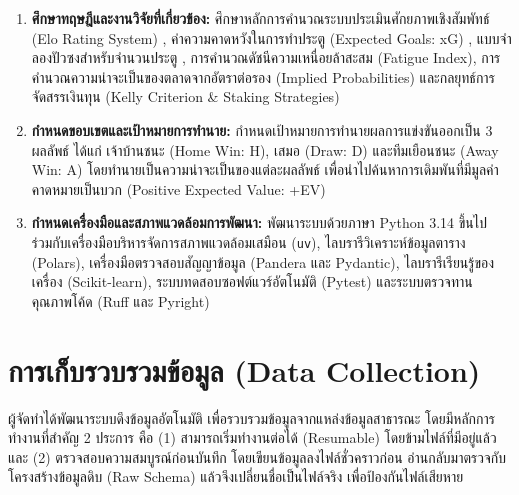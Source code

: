 \begin{enumerate}[label=\arabic*)]
    \item \textbf{ศึกษาทฤษฎีและงานวิจัยที่เกี่ยวข้อง:} ศึกษาหลักการคำนวณระบบประเมินศักยภาพเชิงสัมพัทธ์ (Elo Rating System) \cite{hvattum2010using}, ค่าความคาดหวังในการทำประตู (Expected Goals: xG) \cite{understat2024}, แบบจำลองปัวซงสำหรับจำนวนประตู \cite{dixon1997modelling}, การคำนวณดัชนีความเหนื่อยล้าสะสม (Fatigue Index), การคำนวณความน่าจะเป็นของตลาดจากอัตราต่อรอง (Implied Probabilities) และกลยุทธ์การจัดสรรเงินทุน (Kelly Criterion \& Staking Strategies)
    \item \textbf{กำหนดขอบเขตและเป้าหมายการทำนาย:} กำหนดเป้าหมายการทำนายผลการแข่งขันออกเป็น 3 ผลลัพธ์ ได้แก่ เจ้าบ้านชนะ (Home Win: H), เสมอ (Draw: D) และทีมเยือนชนะ (Away Win: A) โดยทำนายเป็นความน่าจะเป็นของแต่ละผลลัพธ์ เพื่อนำไปค้นหาการเดิมพันที่มีมูลค่าคาดหมายเป็นบวก (Positive Expected Value: +EV)
    \item \textbf{กำหนดเครื่องมือและสภาพแวดล้อมการพัฒนา:} พัฒนาระบบด้วยภาษา Python 3.14 ขึ้นไป ร่วมกับเครื่องมือบริหารจัดการสภาพแวดล้อมเสมือน (\texttt{uv}), ไลบรารีวิเคราะห์ข้อมูลตาราง (Polars), เครื่องมือตรวจสอบสัญญาข้อมูล (Pandera และ Pydantic), ไลบรารีเรียนรู้ของเครื่อง (Scikit-learn), ระบบทดสอบซอฟต์แวร์อัตโนมัติ (Pytest) และระบบตรวจทานคุณภาพโค้ด (Ruff และ Pyright)
\end{enumerate}

\section{การเก็บรวบรวมข้อมูล (Data Collection)}

ผู้จัดทำได้พัฒนาระบบดึงข้อมูลอัตโนมัติ เพื่อรวบรวมข้อมูลจากแหล่งข้อมูลสาธารณะ โดยมีหลักการทำงานที่สำคัญ 2 ประการ คือ (1) สามารถเริ่มทำงานต่อได้ (Resumable) โดยข้ามไฟล์ที่มีอยู่แล้ว และ (2) ตรวจสอบความสมบูรณ์ก่อนบันทึก โดยเขียนข้อมูลลงไฟล์ชั่วคราวก่อน อ่านกลับมาตรวจกับโครงสร้างข้อมูลดิบ (Raw Schema) แล้วจึงเปลี่ยนชื่อเป็นไฟล์จริง เพื่อป้องกันไฟล์เสียหาย

